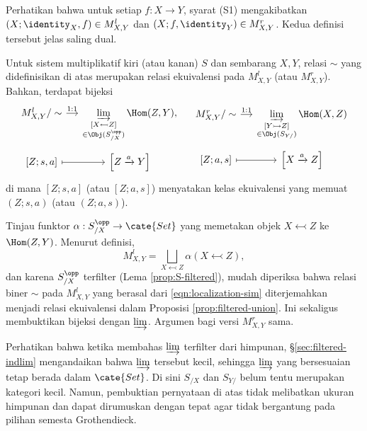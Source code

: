 Perhatikan bahwa untuk setiap $f: X \to Y$, syarat (S1) mengakibatkan
$(X; \identity_X, f) \in M_{X, Y}^l$ dan
$(X; f, \identity_Y) \in M_{X,Y}^r$. Kedua definisi tersebut jelas saling
dual.

\begin{lema}\label{prop:MXY-equiv}
	Untuk sistem multiplikatif kiri (atau kanan) $S$ dan sembarang $X,Y$,
	relasi $\sim$ yang didefinisikan di atas merupakan relasi ekuivalensi pada
	$M_{X,Y}^l$ (atau $M_{X,Y}^r$). Bahkan, terdapat bijeksi
	\[\begin{tikzcd}[row sep=tiny, column sep=small]
		M_{X, Y}^l /\sim \arrow[r, "1:1"] & \displaystyle\varinjlim_{\substack{[X \leftarrowtail Z] \\ \in \Obj(S_{/X}^{\opp})}} \Hom(Z, Y) , \\
		{[Z; s, a]} \arrow[mapsto, r] & {\left[ Z \xrightarrow{a} Y \right]}
	\end{tikzcd} \quad
	\begin{tikzcd}[row sep=tiny, column sep=small]
		M_{X, Y}^r /\sim \arrow[r, "1:1"] & \displaystyle\varinjlim_{\substack{[Y \rightarrowtail Z] \\ \in \Obj(S_{Y/})}} \Hom(X, Z) \\
		{[Z; a, s]} \arrow[mapsto, r] & {\left[ X \xrightarrow{a} Z \right]}
	\end{tikzcd}\]
	di mana $[Z; s, a]$ (atau $[Z; a, s]$) menyatakan kelas ekuivalensi yang
	memuat $(Z; s, a)$ (atau $(Z; a, s)$).
\end{lema}
\begin{bukti}
	Tinjau funktor $\alpha: S_{/X}^{\opp} \to \cate{Set}$ yang memetakan objek
	$X \leftarrowtail Z$ ke $\Hom(Z, Y)$. Menurut definisi,
	\[ M_{X, Y}^l = \bigsqcup_{X \leftarrowtail Z} \alpha(X \leftarrowtail Z), \]
	dan karena $S_{/X}^{\opp}$ terfilter (Lema \ref{prop:S-filtered}), mudah
	diperiksa bahwa relasi biner $\sim$ pada $M_{X,Y}^l$ yang berasal dari
	\eqref{eqn:localization-sim} diterjemahkan menjadi relasi ekuivalensi dalam
	Proposisi \ref{prop:filtered-union}. Ini sekaligus membuktikan bijeksi
	dengan $\varinjlim$. Argumen bagi versi $M_{X,Y}^r$ sama.

	Perhatikan bahwa ketika membahas $\varinjlim$ terfilter dari himpunan,
	\S\ref{sec:filtered-indlim} mengandaikan bahwa $\varinjlim$ tersebut kecil,
	sehingga $\varinjlim$ yang bersesuaian tetap berada dalam $\cate{Set}$.
	Di sini $S_{/X}$ dan
	$S_{Y/}$ belum tentu merupakan kategori kecil. Namun, pembuktian pernyataan
	di atas tidak melibatkan ukuran himpunan dan dapat dirumuskan dengan tepat
	agar tidak bergantung pada pilihan semesta Grothendieck.
\end{bukti}

